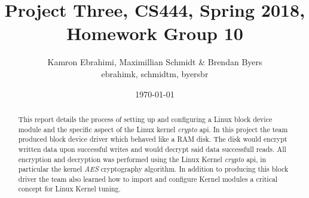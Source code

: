 \documentclass[10pt,onecolumn,draftclsnofoot]{IEEEtran} %
\title{ Project Three, CS444, Spring 2018, Homework Group 10}
\author{Kamron Ebrahimi, Maximillian Schmidt \& Brendan Byers \\ ebrahimk, schmidtm, byersbr }
\date{\today}
\begin{document}
\begin{titlingpage}
\maketitle
\begin{abstract}
\begin{singlespace}
This report details the process of setting up and configuring a Linux block device module and the specific aspect of the Linux kernel \textit{crypto} api. In this project the team produced block device driver which behaved like a RAM  disk. The disk would encrypt written data upon successful writes and would decrypt said data successfull reads. All encryption and decryption was performed using the Linux Kernel \textit{crypto} api, in particular the kernel \textit{AES} cryptography algorithm. In addition to producing this block driver the team also learned how to import and configure Kernel modules a critical concept for Linux Kernel tuning. 
\end{singlespace}
\end{abstract}
\end{titlingpage}


\tableofcontents
\end{document}

